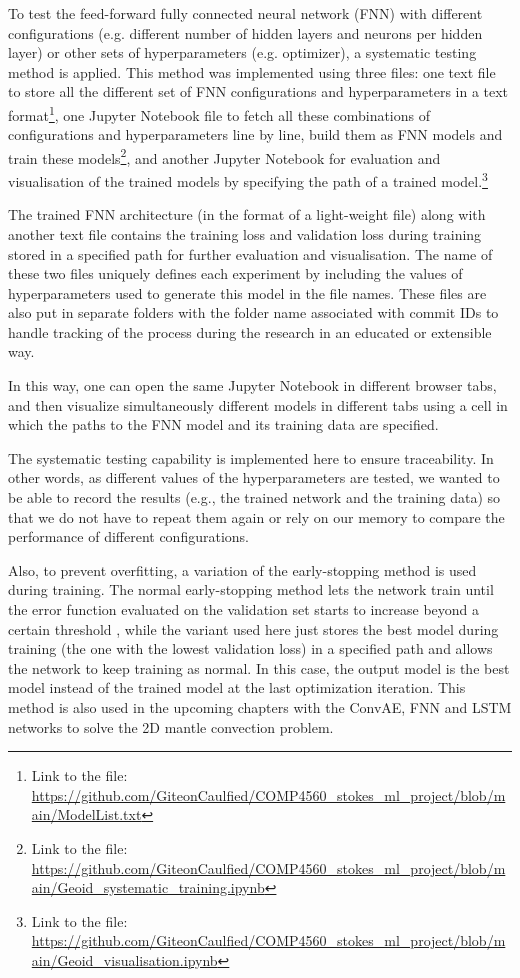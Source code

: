 To test the feed-forward fully connected neural network (FNN) with different configurations (e.g. different number of hidden layers and neurons per hidden layer) or other sets of hyperparameters (e.g. optimizer), a systematic testing method is applied. This method was implemented using three files: one text file to store all the different set of FNN configurations and hyperparameters in a text format\footnote{Link to the file: \url{https://github.com/GiteonCaulfied/COMP4560_stokes_ml_project/blob/main/ModelList.txt}}, one Jupyter Notebook file to fetch all these combinations of configurations and hyperparameters line by line, build them as FNN models and train these models\footnote{Link to the file: \url{https://github.com/GiteonCaulfied/COMP4560_stokes_ml_project/blob/main/Geoid_systematic_training.ipynb}}, and another Jupyter Notebook for evaluation and visualisation of the trained models by specifying the path of a trained model.\footnote{Link to the file: \url{https://github.com/GiteonCaulfied/COMP4560_stokes_ml_project/blob/main/Geoid_visualisation.ipynb}}

The trained FNN architecture (in the format of a light-weight file) along with another text file contains the training loss and validation loss during training stored in a specified path for further evaluation and visualisation. The name of these two files uniquely defines each experiment by including the values of hyperparameters used to generate this model in the file names. These files are also put in separate folders with the folder name associated with commit IDs to handle tracking of the process during the research in an educated or extensible way.

In this way, one can open the same Jupyter Notebook in different browser tabs, and then visualize simultaneously different models in different tabs using a cell in which the paths to the FNN model and its training data are specified. 

The systematic testing capability is implemented here to ensure traceability. In other words, as different values of the hyperparameters are tested, we wanted to be able to record the results (e.g., the trained network and the training data) so that we do not have to repeat them again or rely on our memory to compare the performance of different configurations.

Also, to prevent overfitting, a variation of the early-stopping method is used during training. The normal early-stopping method lets the network train until the error function evaluated on the validation set starts to increase beyond a certain threshold \citep{10.1007_978-3-642-35289-8_5}, while the variant used here just stores the best model during training (the one with the lowest validation loss) in a specified path and allows the network to keep training as normal. In this case, the output model is the best model instead of the trained model at the last optimization iteration. This method is also used in the upcoming chapters with the ConvAE, FNN and LSTM networks to solve the 2D mantle convection problem.

